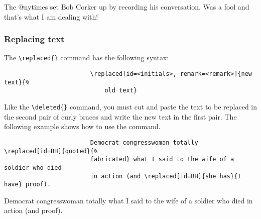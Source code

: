 \documentclass[english]{article}
\newcommand{\cmd}[1]{%
	\texttt{\textbackslash#1\{\}}
}
\begin{document}
				\begin{leftbar}
					The  @nytimes set  Bob Corker 
					up by recording his conversation. 
					Was  a fool and that's what 
					I am dealing with!
				\end{leftbar}
			
			\subsubsection{Replacing text}
			
				The \cmd{replaced} command has the following syntax:
				
				\begin{shaded*}
					\begin{verbatim}
						\replaced[id=<initials>, remark=<remark>]{new text}{%
						    old text}
					\end{verbatim}
				\end{shaded*}
			
				Like the \cmd{deleted} command, you must cut and paste the text to be replaced in
				the second pair of curly braces and write the new text in the first pair. The
				following example shows how to use the command.
				
				\begin{shaded*}
					\begin{verbatim}
						Democrat congresswoman totally \replaced[id=BH]{quoted}{%
						fabricated} what I said to the wife of a soldier who died
						in action (and \replaced[id=BH]{she has}{I have} proof).
					\end{verbatim}
				\end{shaded*}
			
				\begin{leftbar}
					Democrat congresswoman totally  what I said to the wife of a soldier who died
					in action (and \replaced[id=BH]{she has}{I have} proof).
				\end{leftbar}
			
\end{document}
